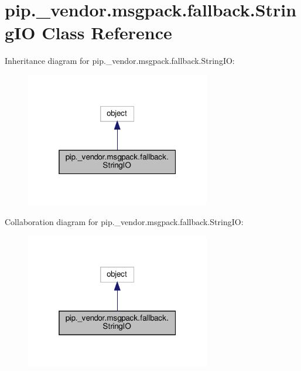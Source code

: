 \hypertarget{classpip_1_1__vendor_1_1msgpack_1_1fallback_1_1StringIO}{}\section{pip.\+\_\+vendor.\+msgpack.\+fallback.\+String\+IO Class Reference}
\label{classpip_1_1__vendor_1_1msgpack_1_1fallback_1_1StringIO}


Inheritance diagram for pip.\+\_\+vendor.\+msgpack.\+fallback.\+String\+IO\+:
\nopagebreak
\begin{figure}[H]
\begin{center}
\leavevmode
\includegraphics[width=229pt]{classpip_1_1__vendor_1_1msgpack_1_1fallback_1_1StringIO__inherit__graph}
\end{center}
\end{figure}


Collaboration diagram for pip.\+\_\+vendor.\+msgpack.\+fallback.\+String\+IO\+:
\nopagebreak
\begin{figure}[H]
\begin{center}
\leavevmode
\includegraphics[width=229pt]{classpip_1_1__vendor_1_1msgpack_1_1fallback_1_1StringIO__coll__graph}
\end{center}
\end{figure}
